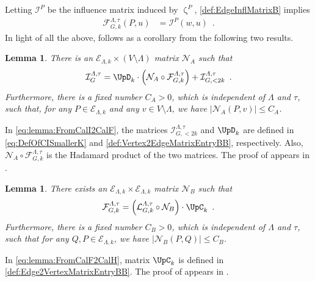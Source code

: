 \documentclass[11pt,reqno]{amsart}
\numberwithin{equation}{section}
\newtheorem{lemma}[theorem]{Lemma}
\newcommand{\cE}{{\mathcal{E}}}
\newcommand{\cF}{{\mathcal{F}}}
\newcommand{\cI}{{\mathcal{I}}}
\newcommand{\cL}{{\mathcal{L}}}
\newcommand{\cN}{{\mathcal{N}}}
\newcommand{\applegreen}[1]{ {\color{applegreen}#1}}
\newcommand{\amethyst}[1]{{\color{amethyst}#1} }
\newcommand{\blue}[1]{{\color{blue}#1}}
\newcommand{\bluepigment}[1]{{\color{blue(pigment)}#1}}
\newcommand{\electricviolet}[1]{{\color{electricviolet}#1}}
\newcommand{\goldenbrown}[1]{{\color{goldenbrown}#1}}
\newcommand{\iris}[1]{{\color{iris}#1}}
\newcommand{\red}[1]{{\color{red}#1}}
\newcommand{\ExtV}{\iris{\cE}}
\newcommand{\infmatrix}{\cI}
\newcommand{\abs}[1]{\blue{|}#1\blue{|}}
\newcommand{\VToEdge}{\UpD}
\newcommand{\EdgeToV}{\UpC}
\renewcommand{\applegreen}[1]{#1}
\renewcommand{\amethyst}[1]{#1}
\renewcommand{\blue}[1]{#1}
\renewcommand{\bluepigment}[1]{#1}
\renewcommand{\electricviolet}[1]{#1}
\renewcommand{\goldenbrown}[1]{#1}
\renewcommand{\iris}[1]{#1}
\renewcommand{\red}[1]{#1}
\newcommand{\kk}{\bluepigment{k}}
\newcommand{\kP}{\goldenbrown{P}}
\newcommand{\kQ}{\amethyst{Q}}
\newcommand{\ku}{\red{u}}
\newcommand{\kv}{\electricviolet{v}}
\newcommand{\kw}{\blue{w}}
\renewcommand{\kk}{k}
\renewcommand{\kP}{P}
\renewcommand{\kQ}{Q}
\renewcommand{\ku}{u}
\renewcommand{\kv}{v}
\renewcommand{\kw}{w}
\newcommand{\ExtdInfMatrixF}{\applegreen{\cL}^{\Lambda,\tau}_{G,\kk}}
\newcommand{\SemExtdInfMatrix}{\cF}
\newcommand{\spset}{\ExtV}
\newcommand{\SymWeightMA}{\cN_A}
\newcommand{\SymWeightMB}{\cN_B}
\begin{document}
Letting $\infmatrix^{\kP}$ be the influence matrix  induced by $\upzeta^{\kP}$, \eqref{def:EdgeInflMatrixB}
implies 
\begin{align}\label{eq:SemExtIndVsInfM}
\SemExtdInfMatrix^{\Lambda, \tau}_{G,\kk}(\kP, \ku) &=\infmatrix^{\kP}(\kw,\ku)\enspace.
\end{align}
%
In light of all the above,  follows as a corollary from the following two results. 


\begin{lemma}\label{lemma:FromCalI2CalF}
There is an $\ExtV_{\Lambda,\kk}\times (V\setminus \Lambda)$ matrix $\SymWeightMA$ such that 
\begin{align}\label{eq:lemma:FromCalI2CalF}
\infmatrix^{\Lambda,\tau}_G = \VToEdge_{\kk} \cdot\left(\SymWeightMA \circ \SemExtdInfMatrix^{\Lambda,\tau}_{G,\kk} \right)+
 \infmatrix^{\Lambda,\tau}_{G, <2\kk} \enspace.
\end{align} 
Furthermore, there is a fixed number $C_A>0$, which is independent of $\Lambda$ and $\tau$, such that, for any
 $\kP\in \ExtV_{\Lambda,\kk}$ and any $\kv\in V\setminus \Lambda$, we have $|\SymWeightMA(\kP,\kv)|\leq C_A$. 
\end{lemma}

In \eqref{eq:lemma:FromCalI2CalF}, the matrices $ \infmatrix^{\Lambda,\tau}_{G, <2{\kk}}$ and $\VToEdge_{\kk}$ are defined in 
\eqref{eq:DefOfCISmallerK} and \eqref{def:Vertex2EdgeMatrixEntryBB}, respectively. 
%
Also, $\SymWeightMA \circ \SemExtdInfMatrix^{\Lambda,\tau}_{G,k}$ is the Hadamard product of the two matrices.
The proof of  appears in .

\begin{lemma}\label{lemma:FromCalF2CalH}
There exists an $\spset_{\Lambda, k}\times \spset_{\Lambda, k}$ matrix $\SymWeightMB$  such that 
\begin{align}\label{eq:lemma:FromCalF2CalH}
\SemExtdInfMatrix^{\Lambda,\tau}_{G,\kk} =\left( \ExtdInfMatrixF \circ \SymWeightMB \right)\cdot \EdgeToV_{\kk}
\enspace.
\end{align}
Furthermore, there is a fixed number $C_B>0$, which is independent of $\Lambda$ and $\tau$,  such that 
 for any $\kQ,\kP\in \ExtV_{\Lambda,\kk}$, we have $\abs{\SymWeightMB(\kP,\kQ)} \leq C_B$. 
\end{lemma}


In \eqref{eq:lemma:FromCalF2CalH}, matrix $\EdgeToV_k$ is defined in \eqref{def:Edge2VertexMatrixEntryBB}.
The proof of  appears in . 
\end{document}
